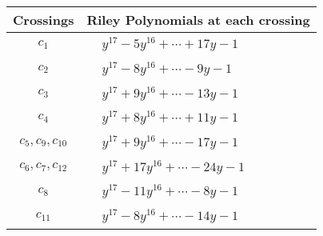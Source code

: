\documentclass[1p]{elsarticle_modified}
\theoremstyle{definition}
\begin{document}
\begin{tabular}{m{50pt}|m{274pt}}
Crossings & \hspace{64pt}Riley Polynomials at each crossing \\
\hline $$\begin{aligned}c_{1}\end{aligned}$$&$\begin{aligned}
&y^{17}-5 y^{16}+\cdots+17 y-1
\end{aligned}$\\
\hline $$\begin{aligned}c_{2}\end{aligned}$$&$\begin{aligned}
&y^{17}-8 y^{16}+\cdots-9 y-1
\end{aligned}$\\
\hline $$\begin{aligned}c_{3}\end{aligned}$$&$\begin{aligned}
&y^{17}+9 y^{16}+\cdots-13 y-1
\end{aligned}$\\
\hline $$\begin{aligned}c_{4}\end{aligned}$$&$\begin{aligned}
&y^{17}+8 y^{16}+\cdots+11 y-1
\end{aligned}$\\
\hline $$\begin{aligned}c_{5},c_{9},c_{10}\end{aligned}$$&$\begin{aligned}
&y^{17}+9 y^{16}+\cdots-17 y-1
\end{aligned}$\\
\hline $$\begin{aligned}c_{6},c_{7},c_{12}\end{aligned}$$&$\begin{aligned}
&y^{17}+17 y^{16}+\cdots-24 y-1
\end{aligned}$\\
\hline $$\begin{aligned}c_{8}\end{aligned}$$&$\begin{aligned}
&y^{17}-11 y^{16}+\cdots-8 y-1
\end{aligned}$\\
\hline $$\begin{aligned}c_{11}\end{aligned}$$&$\begin{aligned}
&y^{17}-8 y^{16}+\cdots-14 y-1
\end{aligned}$\\
\hline
\end{tabular}\\~\\
\end{document}
